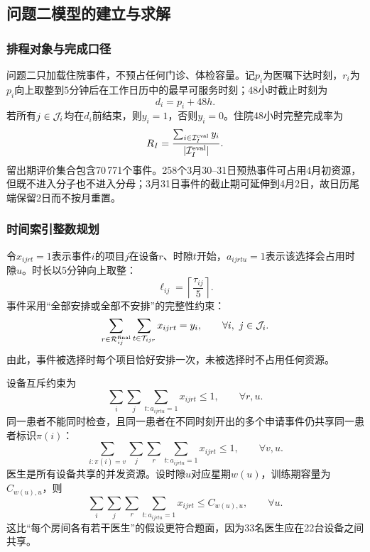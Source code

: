\subsection{问题二模型的建立与求解}

\subsubsection{排程对象与完成口径}

问题二只加载住院事件，不预占任何门诊、体检容量。记$p_i$为医嘱下达时刻，$r_i$为$p_i$向上取整到5分钟后在工作日历中的最早可服务时刻；48小时截止时刻为
\begin{equation}
d_i=p_i+48\unit{h}.
\end{equation}
若所有$j\in\mathcal{J}_i$均在$d_i$前结束，则$y_i=1$，否则$y_i=0$。住院48小时完整完成率为
\begin{equation}
R_I=\frac{\sum_{i\in\mathcal{I}_I^{\mathrm{eval}}}y_i}{|\mathcal{I}_I^{\mathrm{eval}}|}.
\end{equation}
留出期评价集合包含70\,771个事件。258个3月30--31日预热事件可占用4月初资源，但既不进入分子也不进入分母；3月31日事件的截止期可延伸到4月2日，故日历尾端保留2日而不按月重置。

\subsubsection{时间索引整数规划}

令$x_{ijrt}=1$表示事件$i$的项目$j$在设备$r$、时隙$t$开始，$a_{ijrtu}=1$表示该选择会占用时隙$u$。时长以5分钟向上取整：
\begin{equation}
\ell_{ij}=\left\lceil\frac{\tau_{ij}}{5}\right\rceil.
\end{equation}
事件采用“全部安排或全部不安排”的完整性约束：
\begin{equation}
\sum_{r\in\mathcal{R}_{ij}^{\mathrm{final}}}\sum_{t\in\mathcal{T}_{ijr}}x_{ijrt}=y_i,
\qquad \forall i,\ j\in\mathcal{J}_i.
\end{equation}
由此，事件被选择时每个项目恰好安排一次，未被选择时不占用任何资源。

设备互斥约束为
\begin{equation}
\sum_i\sum_j\sum_{t:a_{ijrtu}=1}x_{ijrt}\le1,
\qquad \forall r,u.
\end{equation}
同一患者不能同时检查，且同一患者在不同时刻开出的多个申请事件仍共享同一患者标识$\pi(i)$：
\begin{equation}
\sum_{i:\pi(i)=v}\sum_j\sum_r\sum_{t:a_{ijrtu}=1}x_{ijrt}\le1,
\qquad \forall v,u.
\end{equation}
医生是所有设备共享的并发资源。设时隙$u$对应星期$w(u)$，训练期容量为$C_{w(u),u}$，则
\begin{equation}
\sum_i\sum_j\sum_r\sum_{t:a_{ijrtu}=1}x_{ijrt}\le C_{w(u),u},\qquad\forall u.
\end{equation}
这比“每个房间各有若干医生”的假设更符合题面，因为33名医生应在22台设备之间共享。

